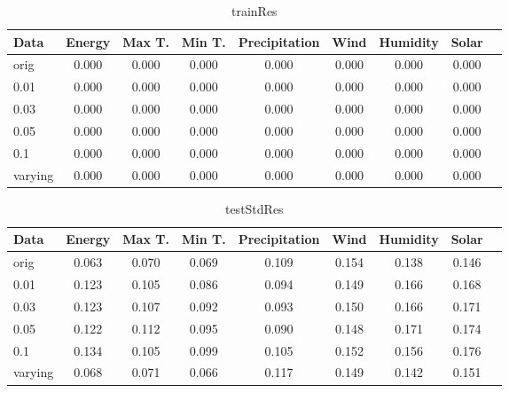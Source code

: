 \documentclass[12pt]{article}
\begin{document}
\begin{table}
\begin{tabular}{|p{2cm}|c|c|c|c|c|c|c|c|}
\hline
Data &Energy & Max T. & Min T. & Precipitation & Wind & Humidity & Solar\\
\hline
\multirow{1}{*}{orig} &   0.000 &    0.000 &    0.000 &    0.000 &    0.000 &    0.000 &    0.000\\
\cline{1-7}
\hline
\multirow{1}{*}{0.01} &   0.000 &    0.000 &    0.000 &    0.000 &    0.000 &    0.000 &    0.000\\
\cline{1-7}
\hline
\multirow{1}{*}{0.03} &   0.000 &    0.000 &    0.000 &    0.000 &    0.000 &    0.000 &    0.000\\
\cline{1-7}
\hline
\multirow{1}{*}{0.05} &   0.000 &    0.000 &    0.000 &    0.000 &    0.000 &    0.000 &    0.000\\
\cline{1-7}
\hline
\multirow{1}{*}{0.1} &   0.000 &    0.000 &    0.000 &    0.000 &    0.000 &    0.000 &    0.000\\
\cline{1-7}
\hline
\multirow{1}{*}{varying} &   0.000 &    0.000 &    0.000 &    0.000 &    0.000 &    0.000 &    0.000\\
\cline{1-7}
\hline
\end{tabular}\caption{trainRes}
\end{table}

\begin{table}
\begin{tabular}{|p{2cm}|c|c|c|c|c|c|c|c|}
\hline
Data &Energy & Max T. & Min T. & Precipitation & Wind & Humidity & Solar\\
\hline
\multirow{1}{*}{orig} &   0.063 &    0.070 &    0.069 &    0.109 &    0.154 &    0.138 &    0.146\\
\cline{1-7}
\hline
\multirow{1}{*}{0.01} &   0.123 &    0.105 &    0.086 &    0.094 &    0.149 &    0.166 &    0.168\\
\cline{1-7}
\hline
\multirow{1}{*}{0.03} &   0.123 &    0.107 &    0.092 &    0.093 &    0.150 &    0.166 &    0.171\\
\cline{1-7}
\hline
\multirow{1}{*}{0.05} &   0.122 &    0.112 &    0.095 &    0.090 &    0.148 &    0.171 &    0.174\\
\cline{1-7}
\hline
\multirow{1}{*}{0.1} &   0.134 &    0.105 &    0.099 &    0.105 &    0.152 &    0.156 &    0.176\\
\cline{1-7}
\hline
\multirow{1}{*}{varying} &   0.068 &    0.071 &    0.066 &    0.117 &    0.149 &    0.142 &    0.151\\
\cline{1-7}
\hline
\end{tabular}\caption{testStdRes}
\end{table}
\end{document}
